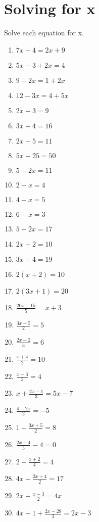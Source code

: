 \documentclass{article}
\begin{document}
\section{Solving for x}
Solve each equation for x.
\begin{enumerate}
\item $7x+4=2x+9$
\item $5x-3+2x=4$
\item $9-2x=1+2x$
\item $12-3x=4+5x$
\item $2x+3=9$
\item $3x+4=16$
\item $2x-5=11$
\item $5x-25=50$
\item $5-2x=11$
\item $2-x=4$
\item $4-x=5$
\item $6-x=3$
\item $5+2x=17$
\item $2x+2=10$
\item $3x+4=19$
\item $2(x+2)=10$
\item $2(3x+1)=20$
\item {\Large $\frac{20x-15}{5}=x+3$}
\item {\Large $\frac{3x-5}{2}=5$}
\item {\Large $\frac{2x+2}{3}=6$}
\item {\Large $\frac{x+4}{2}=10$}
\item {\Large $\frac{x-3}{3}=4$}
\item {\Large $x+\frac{2x-1}{3}=5x-7$}
\item {\Large $\frac{4-2x}{2}=-5$}
\item {\Large $1+\frac{3x+5}{2}=8$}
\item {\Large $\frac{2x-4}{3}-4=0$}
\item {\Large $2+\frac{x+2}{4}=4$}
\item {\Large $4x+\frac{2x+4}{2}=17$}
\item {\Large $2x+\frac{x-3}{2}=4x$}
\item {\Large $4x+1+\frac{2x-28}{3}=2x-3$}

\end{enumerate}
\end{document}
